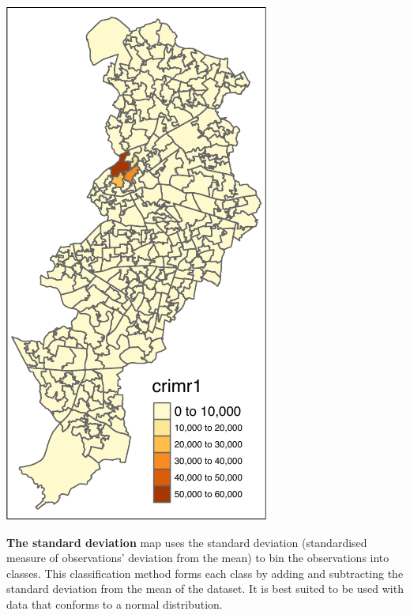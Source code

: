 \documentclass[
]{book}
\begin{document}
\includegraphics{crime_mapping_files/figure-latex/unnamed-chunk-84-1.pdf}

\textbf{The standard deviation} map uses the standard deviation (standardised measure of observations' deviation from the mean) to bin the observations into classes. This classification method forms each class by adding and subtracting the standard deviation from the mean of the dataset. It is best suited to be used with data that conforms to a normal distribution.
\end{document}
